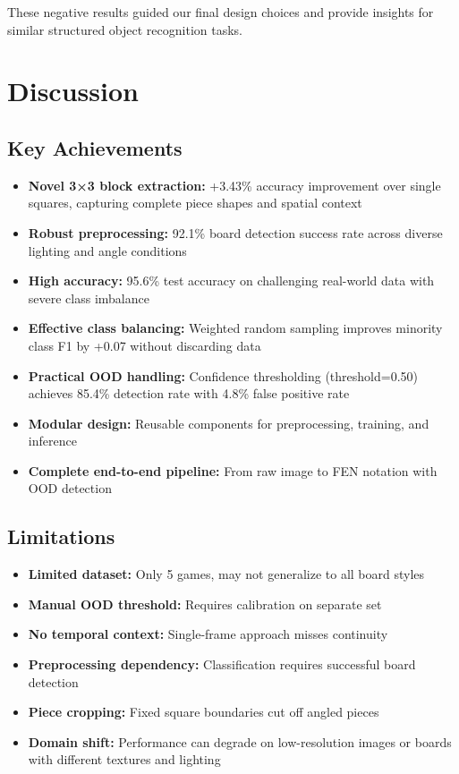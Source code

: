\documentclass[conference]{IEEEtran}
\begin{document}
These negative results guided our final design choices and provide insights for similar structured object recognition tasks.

\section{Discussion}

\subsection{Key Achievements}

\begin{itemize}
    \item \textbf{Novel 3×3 block extraction:} +3.43\% accuracy improvement over single squares, capturing complete piece shapes and spatial context
    \item \textbf{Robust preprocessing:} 92.1\% board detection success rate across diverse lighting and angle conditions
    \item \textbf{High accuracy:} 95.6\% test accuracy on challenging real-world data with severe class imbalance
    \item \textbf{Effective class balancing:} Weighted random sampling improves minority class F1 by +0.07 without discarding data
    \item \textbf{Practical OOD handling:} Confidence thresholding (threshold=0.50) achieves 85.4\% detection rate with 4.8\% false positive rate
    \item \textbf{Modular design:} Reusable components for preprocessing, training, and inference
    \item \textbf{Complete end-to-end pipeline:} From raw image to FEN notation with OOD detection
\end{itemize}

\subsection{Limitations}

\begin{itemize}
    \item \textbf{Limited dataset:} Only 5 games, may not generalize to all board styles
    \item \textbf{Manual OOD threshold:} Requires calibration on separate set
    \item \textbf{No temporal context:} Single-frame approach misses continuity
    \item \textbf{Preprocessing dependency:} Classification requires successful board detection
    \item \textbf{Piece cropping:} Fixed square boundaries cut off angled pieces
    \item \textbf{Domain shift:} Performance can degrade on low-resolution images or boards with different textures and lighting
\end{itemize}
\end{document}
